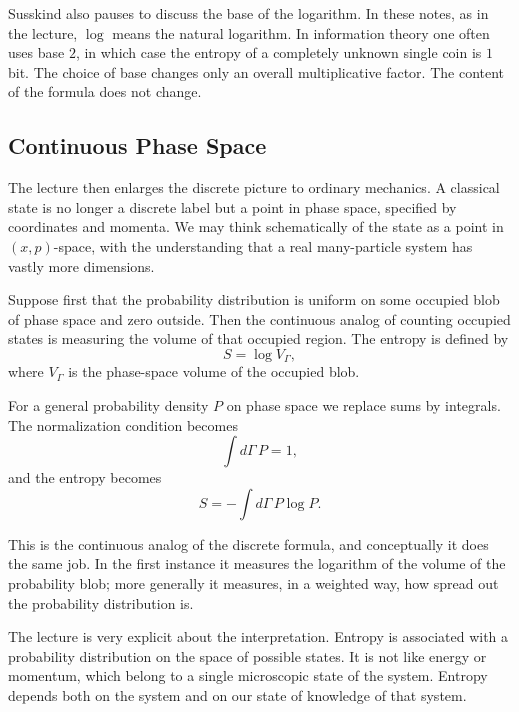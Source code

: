 Susskind also pauses to discuss the base of the logarithm. In these notes, as in the lecture, \(\log\) means the natural logarithm. In information theory one often uses base \(2\), in which case the entropy of a completely unknown single coin is \(1\) bit. The choice of base changes only an overall multiplicative factor. The content of the formula does not change.

\subsection{Continuous Phase Space}

The lecture then enlarges the discrete picture to ordinary mechanics. A classical state is no longer a discrete label but a point in phase space, specified by coordinates and momenta. We may think schematically of the state as a point in \((x,p)\)-space, with the understanding that a real many-particle system has vastly more dimensions.

Suppose first that the probability distribution is uniform on some occupied blob of phase space and zero outside. Then the continuous analog of counting occupied states is measuring the volume of that occupied region. The entropy is defined by
\begin{equation}
S=\log V_{\Gamma},
\end{equation}
where \(V_{\Gamma}\) is the phase-space volume of the occupied blob.

For a general probability density \(P\) on phase space we replace sums by integrals. The normalization condition becomes
\begin{equation}
\int d\Gamma\, P = 1,
\end{equation}
and the entropy becomes
\begin{equation}
S=-\int d\Gamma\, P\log P.
\end{equation}

This is the continuous analog of the discrete formula, and conceptually it does the same job. In the first instance it measures the logarithm of the volume of the probability blob; more generally it measures, in a weighted way, how spread out the probability distribution is.

The lecture is very explicit about the interpretation. Entropy is associated with a probability distribution on the space of possible states. It is not like energy or momentum, which belong to a single microscopic state of the system. Entropy depends both on the system and on our state of knowledge of that system.

